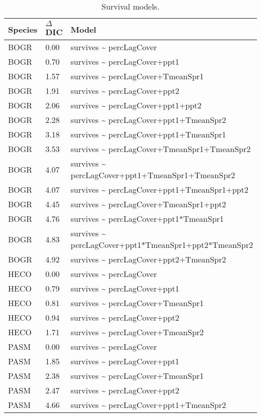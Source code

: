 \documentclass[10pt]{article}
\begin{document}
\begin{table}[ht]
\centering
\caption{Survival models.} 
\begin{tabularx}{\textwidth}{llZ}
  \hline
Species & $\Delta$DIC & Model \\ 
  \hline
BOGR & 0.00 & survives \~{} percLagCover \\ 
  BOGR & 0.70 & survives \~{} percLagCover+ppt1 \\ 
  BOGR & 1.57 & survives \~{} percLagCover+TmeanSpr1 \\ 
  BOGR & 1.91 & survives \~{} percLagCover+ppt2 \\ 
  BOGR & 2.06 & survives \~{} percLagCover+ppt1+ppt2 \\ 
  BOGR & 2.28 & survives \~{} percLagCover+ppt1+TmeanSpr2 \\ 
  BOGR & 3.18 & survives \~{} percLagCover+ppt1+TmeanSpr1 \\ 
  BOGR & 3.53 & survives \~{} percLagCover+TmeanSpr1+TmeanSpr2 \\ 
  BOGR & 4.07 & survives \~{} percLagCover+ppt1+TmeanSpr1+TmeanSpr2 \\ 
  BOGR & 4.07 & survives \~{} percLagCover+ppt1+TmeanSpr1+ppt2 \\ 
  BOGR & 4.45 & survives \~{} percLagCover+TmeanSpr1+ppt2 \\ 
  BOGR & 4.76 & survives \~{} percLagCover+ppt1*TmeanSpr1 \\ 
  BOGR & 4.83 & survives \~{} percLagCover+ppt1*TmeanSpr1+ppt2*TmeanSpr2 \\ 
  BOGR & 4.92 & survives \~{} percLagCover+ppt2+TmeanSpr2 \\ 
  HECO & 0.00 & survives \~{} percLagCover \\ 
  HECO & 0.79 & survives \~{} percLagCover+ppt1 \\ 
  HECO & 0.81 & survives \~{} percLagCover+TmeanSpr1 \\ 
  HECO & 0.94 & survives \~{} percLagCover+ppt2 \\ 
  HECO & 1.71 & survives \~{} percLagCover+TmeanSpr2 \\ 
  PASM & 0.00 & survives \~{} percLagCover \\ 
  PASM & 1.85 & survives \~{} percLagCover+ppt1 \\ 
  PASM & 2.38 & survives \~{} percLagCover+TmeanSpr1 \\ 
  PASM & 2.47 & survives \~{} percLagCover+ppt2 \\ 
  PASM & 4.66 & survives \~{} percLagCover+ppt1+TmeanSpr2 \\ 

\end{tabularx}
\end{table}
\end{document}
